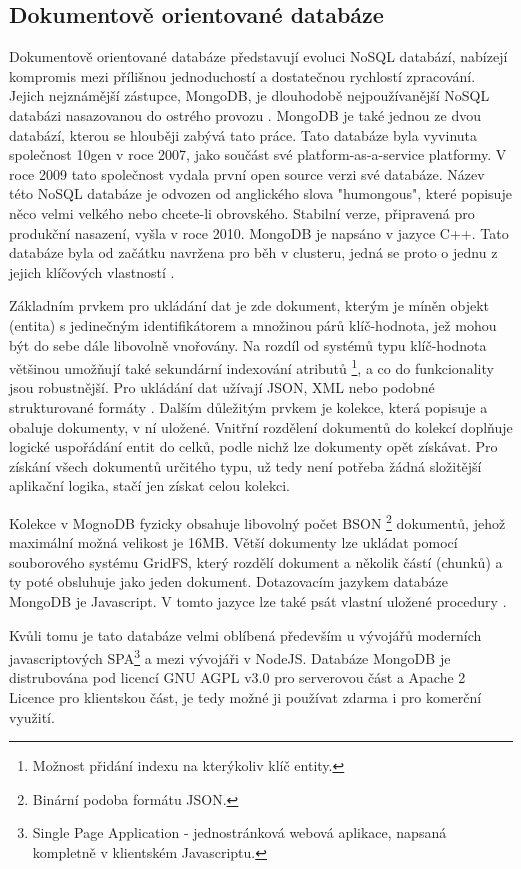 \subsection{Dokumentově orientované databáze}
\label{section:documentsDB}
Dokumentově orientované databáze představují evoluci NoSQL databází, nabízejí kompromis mezi přílišnou jednoduchostí a dostatečnou rychlostí zpracování. Jejich  nejznámější zástupce, MongoDB, je dlouhodobě nejpoužívanější NoSQL databázi nasazovanou do ostrého provozu  \cite{enginesRanking}.
MongoDB je také jednou ze dvou databází, kterou se hlouběji zabývá tato práce. Tato databáze byla vyvinuta společnost 10gen v roce 2007, jako součást své platform-as-a-service platformy. V roce 2009 tato společnost vydala první open source verzi své databáze. Název této NoSQL databáze je odvozen od anglického slova "humongous", které popisuje něco velmi velkého nebo chcete-li obrovského.  Stabilní verze, připravená pro produkční nasazení, vyšla v roce 2010. MongoDB je napsáno v jazyce C++. Tato databáze byla od začátku navržena pro běh v clusteru, jedná se proto o jednu z jejich klíčových vlastností  \cite{peteraMongo}.

Základním prvkem pro ukládání dat je zde dokument, kterým je míněn objekt (entita) s jedinečným identifikátorem a množinou párů klíč-hodnota, jež mohou být do sebe dále libovolně vnořovány. Na rozdíl od systémů typu klíč-hodnota většinou umožňují také sekundární indexování atributů \footnote{Možnost přidání indexu na kterýkoliv klíč entity.},  a co do funkcionality jsou robustnější. Pro ukládání dat užívají JSON, XML nebo podobné strukturované formáty  \cite{regnerVse}.
Dalším důležitým prvkem je kolekce, která popisuje a obaluje dokumenty, v ní uložené. Vnitřní rozdělení dokumentů do kolekcí doplňuje logické uspořádání entit do celků, podle nichž lze dokumenty opět získávat. Pro získání všech dokumentů určitého typu, už tedy není potřeba žádná složitější aplikační logika, stačí jen získat celou kolekci.

Kolekce v MognoDB fyzicky obsahuje libovolný počet BSON \footnote{Binární podoba formátu JSON.} dokumentů, jehož maximální možná velikost je 16MB. Větší dokumenty lze ukládat pomocí souborového systému GridFS, který rozdělí dokument a několik částí (chunků) a ty poté obsluhuje jako jeden dokument. Dotazovacím jazykem databáze MongoDB je Javascript. V tomto jazyce lze také psát vlastní uložené procedury \cite{mongoDocs}. 

Kvůli tomu je tato databáze velmi oblíbená především u vývojářů moderních javascriptových SPA\footnote{Single Page Application - jednostránková webová aplikace, napsaná kompletně v klientském Javascriptu.} a mezi vývojáři v NodeJS. Databáze MongoDB je distrubována pod licencí GNU AGPL v3.0 pro serverovou část a Apache 2 Licence pro klientskou část, je tedy možné ji používat zdarma i pro komerční využití.

